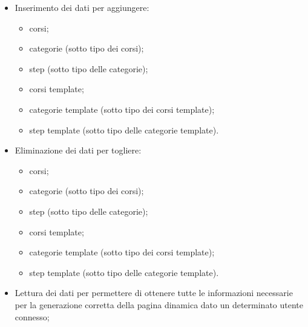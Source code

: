 \begin{itemize}
	\item Inserimento dei dati per aggiungere:
	      \begin{itemize}
		      \item corsi;
		      \item categorie (sotto tipo dei corsi);
		      \item step (sotto tipo delle categorie);
		      \item corsi template;
		      \item categorie template (sotto tipo dei corsi template);
		      \item step template (sotto tipo delle categorie template).
	      \end{itemize}
	\item Eliminazione dei dati per togliere:
	      \begin{itemize}
		      \item corsi;
		      \item categorie (sotto tipo dei corsi);
		      \item step (sotto tipo delle categorie);
		      \item corsi template;
		      \item categorie template (sotto tipo dei corsi template);
		      \item step template (sotto tipo delle categorie template).
	      \end{itemize}
	\item Lettura dei dati per permettere di ottenere tutte le informazioni necessarie
	      per la generazione corretta della pagina dinamica dato un determinato utente
	      connesso;
\end{itemize}
%

